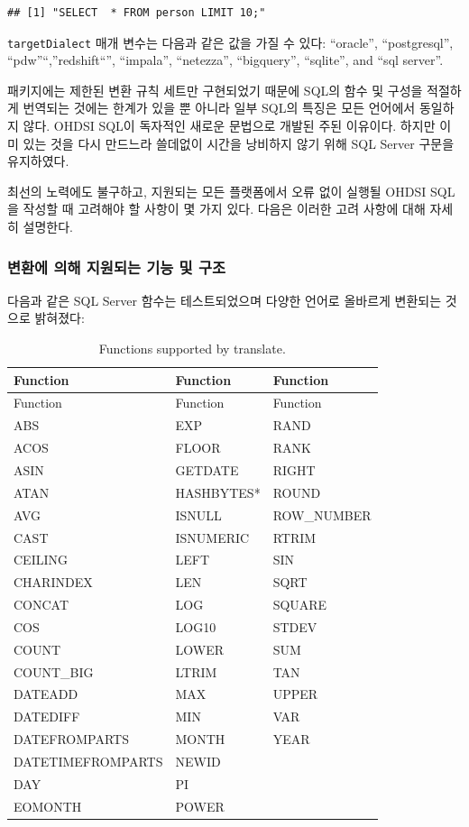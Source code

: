 \documentclass[11pt]{book}
\theoremstyle{definition}
\theoremstyle{definition}
\theoremstyle{definition}
\theoremstyle{remark}
\let\BeginKnitrBlock\begin \let\EndKnitrBlock\end
\begin{document}
\begin{verbatim}
## [1] "SELECT  * FROM person LIMIT 10;"
\end{verbatim}

\texttt{targetDialect} 매개 변수는 다음과 같은 값을 가질 수 있다:
``oracle'', ``postgresql'', ``pdw''``,''redshift``'', ``impala'',
``netezza'', ``bigquery'', ``sqlite'', and ``sql server''.

\BeginKnitrBlock{rmdimportant}
패키지에는 제한된 변환 규칙 세트만 구현되었기 때문에 SQL의 함수 및
구성을 적절하게 번역되는 것에는 한계가 있을 뿐 아니라 일부 SQL의 특징은
모든 언어에서 동일하지 않다. OHDSI SQL이 독자적인 새로운 문법으로 개발된
주된 이유이다. 하지만 이미 있는 것을 다시 만드느라 쓸데없이 시간을
낭비하지 않기 위해 SQL Server 구문을 유지하였다.
\EndKnitrBlock{rmdimportant}

최선의 노력에도 불구하고, 지원되는 모든 플랫폼에서 오류 없이 실행될
OHDSI SQL을 작성할 때 고려해야 할 사항이 몇 가지 있다. 다음은 이러한
고려 사항에 대해 자세히 설명한다.

\subsubsection*{변환에 의해 지원되는 기능 및 구조}\label{-----}

다음과 같은 SQL Server 함수는 테스트되었으며 다양한 언어로 올바르게
변환되는 것으로 밝혀졌다: 

\begin{longtable}[]{@{}lll@{}}
\caption{\label{tab:sqlFunctions} Functions supported by
translate.}\tabularnewline
\toprule
Function & Function & Function\tabularnewline
\midrule
\endfirsthead
\toprule
Function & Function & Function\tabularnewline
\midrule
\endhead
ABS & EXP & RAND\tabularnewline
ACOS & FLOOR & RANK\tabularnewline
ASIN & GETDATE & RIGHT\tabularnewline
ATAN & HASHBYTES* & ROUND\tabularnewline
AVG & ISNULL & ROW\_NUMBER\tabularnewline
CAST & ISNUMERIC & RTRIM\tabularnewline
CEILING & LEFT & SIN\tabularnewline
CHARINDEX & LEN & SQRT\tabularnewline
CONCAT & LOG & SQUARE\tabularnewline
COS & LOG10 & STDEV\tabularnewline
COUNT & LOWER & SUM\tabularnewline
COUNT\_BIG & LTRIM & TAN\tabularnewline
DATEADD & MAX & UPPER\tabularnewline
DATEDIFF & MIN & VAR\tabularnewline
DATEFROMPARTS & MONTH & YEAR\tabularnewline
DATETIMEFROMPARTS & NEWID &\tabularnewline
DAY & PI &\tabularnewline
EOMONTH & POWER &\tabularnewline
\bottomrule
\end{longtable}
\end{document}
